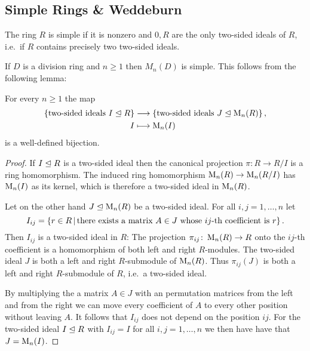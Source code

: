 \subsection{Simple Rings \& Weddeburn}


\begin{definition}
  The ring $R$ is simple if it is nonzero and $0, R$ are the only two-sided ideals of $R$, i.e.\ if $R$ contains precisely two two-sided ideals.
\end{definition}


\begin{example}
  \label{example: simple ring}
  If $D$ is a division ring and $n \geq 1$ then $M_n(D)$ is simple.
  This follows from the following lemma:
\end{example}


\begin{lemma}
  For every $n \geq 1$ the map
  \begin{align*}
              \{ \text{two-sided ideals $I \trianglelefteq R$} \}
    &\longrightarrow  \{ \text{two-sided ideals $J \trianglelefteq \operatorname{M}_n(R)$} \} \,,
    \\
                  I
    &\longmapsto  \operatorname{M}_n(I)
  \end{align*}
  is a well-defined bijection.
\end{lemma}


\begin{proof}
  If $I \trianglelefteq R$ is a two-sided ideal then the canonical projection $\pi \colon R \to R/I$ is a ring homomorphism.
  The induced ring homomorphism $\operatorname{M}_n(R) \to \operatorname{M}_n(R/I)$ has $\operatorname{M}_n(I)$ as its kernel, which is therefore a two-sided ideal in $\operatorname{M}_n(R)$.
  
  Let on the other hand $J \trianglelefteq \operatorname{M}_n(R)$ be a two-sided ideal.
  For all $i, j = 1, \dotsc, n$ let
  \[
      I_{ij}
    = \{
        r \in R
      \suchthat
        \text{there exists a matrix $A \in J$ whose $ij$-th coefficient is $r$}
      \} \,.
  \]
  Then $I_{ij}$ is a two-sided ideal in $R$:
  The projection $\pi_{ij} \colon \operatorname{M}_n(R) \to R$ onto the $ij$-th coefficient is a homomorphism of both left and right $R$-modules.
  The two-sided ideal $J$ is both a left and right $R$-submodule of $\operatorname{M}_n(R)$.
  Thus $\pi_{ij}(J)$ is both a left and right $R$-submodule of $R$, i.e.\ a two-sided ideal.
  
  By multiplying the a matrix $A \in J$ with an permutation matrices from the left and from the right we can move every coefficient of $A$ to every other position without leaving $A$.
  It follows that $I_{ij}$ does not depend on the position $ij$.
  For the two-sided ideal $I \trianglelefteq R$ with $I_{ij} = I$ for all $i, j = 1, \dotsc, n$ we then have have that $J = \operatorname{M}_n(I)$.
\end{proof}


